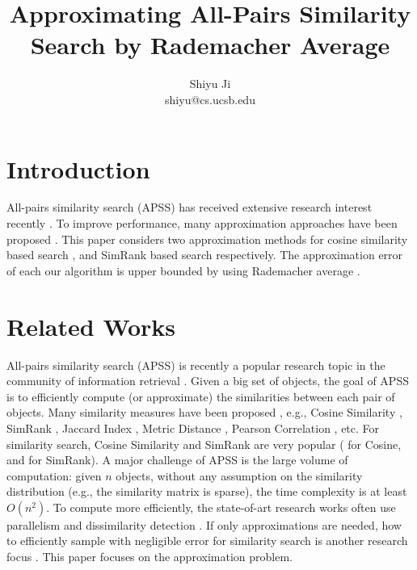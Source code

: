 \documentclass{article}
\begin{document}
\title{\Large\bf Approximating All-Pairs Similarity Search by Rademacher Average}
\author{Shiyu Ji\\ shiyu@cs.ucsb.edu}
\date{}
\maketitle

\newtheorem{definition}{Definition}
\theoremstyle{definition}
\newtheorem{theorem}{Theorem}
\theoremstyle{plain}
\newtheorem{lemma}{Lemma}
\theoremstyle{plain}
\newtheorem{corollary}{Corollary}
\theoremstyle{plain}

\section{Introduction}
All-pairs similarity search (APSS) has received extensive research interest recently \cite{BMS07,Xia16,ATY13,TAJY14}. To improve performance, many approximation approaches have been proposed \cite{GIM99,FKS03,IM98,Char02}. This paper considers two approximation methods for cosine similarity based search \cite{SGM00,Xia16,ATY13,TAJY14}, and SimRank based search \cite{JW02,LH10,FNS13,KMK14} respectively. The approximation error of each our algorithm is upper bounded by using Rademacher average \cite{BM02,Mohri09,BBM05}.

\section{Related Works}
All-pairs similarity search (APSS) is recently a popular research topic in the community of information retrieval \cite{BMS07,Xia16,ATY13,TAJY14}. Given a big set of objects, the goal of APSS is to efficiently compute (or approximate) the similarities between each pair of objects. Many similarity measures have been proposed \cite{SGM00}, e.g., Cosine Similarity \cite{TP07}, SimRank \cite{JW02}, Jaccard Index \cite{HHH89}, Metric Distance \cite{SGM00}, Pearson Correlation \cite{BCY09}, etc. For similarity search, Cosine Similarity and SimRank are very popular (\cite{TP07,Xia16,ATY13,TAJY14} for Cosine, and \cite{LH10,FNS13,KMK14,YM15} for SimRank). A major challenge of APSS is the large volume of computation: given $n$ objects, without any assumption on the similarity distribution (e.g., the similarity matrix is sparse), the time complexity is at least $O(n^2)$. To compute more efficiently, the state-of-art research works often use parallelism \cite{CCK12,HFL10} and dissimilarity detection \cite{ATY13,TAJY14}. If only approximations are needed, how to efficiently sample with negligible error for similarity search is another research focus \cite{GIM99,FKS03,IM98,Char02}. This paper focuses on the approximation problem.
\end{document}
